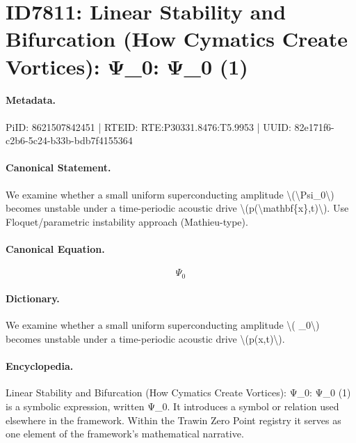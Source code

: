 \section*{ID7811: Linear Stability and Bifurcation (How Cymatics Create Vortices): Ψ\_0: Ψ\_0 (1)}
\paragraph{Metadata.}
PiID: 8621507842451 | RTEID: RTE:P30331.8476:T5.9953 | UUID: 82e171f6-c2b6-5c24-b33b-bdb7f4155364

\paragraph{Canonical Statement.}
We examine whether a small uniform superconducting amplitude \textbackslash{}(\textbackslash{}Psi\_0\textbackslash{}) becomes unstable under a time-periodic acoustic drive \textbackslash{}(p(\textbackslash{}mathbf\{x\},t)\textbackslash{}). Use Floquet/parametric instability approach (Mathieu-type).

\paragraph{Canonical Equation.}
\[
\Psi_0
\]

\paragraph{Dictionary.}
We examine whether a small uniform superconducting amplitude \textbackslash{}( \_0\textbackslash{}) becomes unstable under a time-periodic acoustic drive \textbackslash{}(p(x,t)\textbackslash{}).

\paragraph{Encyclopedia.}
Linear Stability and Bifurcation (How Cymatics Create Vortices): Ψ\_0: Ψ\_0 (1) is a symbolic expression, written Ψ\_0. It introduces a symbol or relation used elsewhere in the framework. Within the Trawin Zero Point registry it serves as one element of the framework's mathematical narrative.

